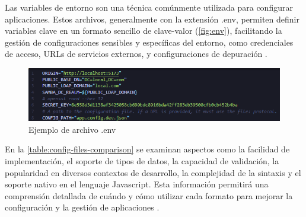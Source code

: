 Las variables de entorno son una técnica comúnmente utilizada para configurar aplicaciones. Estos archivos, generalmente con la extensión .env, permiten definir variables clave en un formato sencillo de clave-valor (\autoref{fig:env}), facilitando la gestión de configuraciones sensibles y específicas del entorno, como credenciales de acceso, URLs de servicios externos, y configuraciones de depuración \autocite{pandey_guide_2022}.

\begin{figure}[H]
    \centering
    \includegraphics{images/env.png}
    \caption{Ejemplo de archivo .env}
    \label{fig:env}
\end{figure}

En la \autoref{table:config-files-comparison} se examinan aspectos como la facilidad de implementación, el soporte de tipos de datos, la capacidad de validación, la popularidad en diversos contextos de desarrollo, la complejidad de la sintaxis y el soporte nativo en el lenguaje Javascript. Esta información permitirá una comprensión detallada de cuándo y cómo utilizar cada formato para mejorar la configuración y la gestión de aplicaciones \autocite{pandey_guide_2022,aws_yaml_2023,eriksson_comparison_2011}.

